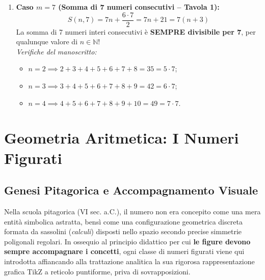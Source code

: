 \documentclass[11pt,a4paper,oneside]{report}
\begin{document}
\begin{laboratorio}
\begin{enumerate}[leftmargin=2em]
  \[
  S(n, 4) = n + (n+1) + (n+2) + (n+3) = 4n + 6 = 2(2n + 3)
  \]
  Tale somma \`e sempre pari ma \textbf{mai multipla di 4}. Per $n = 2$ si ottiene:
  \[
  S(2, 4) = 2 + 3 + 4 + 5 = 14 \quad (\text{divisibile per } 7)
  \]
  \item \textbf{Caso $m = 7$ (Somma di 7 numeri consecutivi -- Tavola 1):}
  \[
  S(n, 7) = 7n + \frac{6 \cdot 7}{2} = 7n + 21 = 7(n + 3)
  \]
  La somma di 7 numeri interi consecutivi \`e \textbf{SEMPRE divisibile per 7}, per qualunque valore di $n \in \mathbb{N}$!\\
  \textit{Verifiche del manoscritto:}
  \begin{itemize}
    \item $n = 2 \implies 2+3+4+5+6+7+8 = 35 = 5 \cdot 7$;
    \item $n = 3 \implies 3+4+5+6+7+8+9 = 42 = 6 \cdot 7$;
    \item $n = 4 \implies 4+5+6+7+8+9+10 = 49 = 7 \cdot 7$.
  \end{itemize}
\end{enumerate}
\end{laboratorio}

\chapter{Geometria Aritmetica: I Numeri Figurati}

\section{Genesi Pitagorica e Accompagnamento Visuale}
Nella scuola pitagorica (VI sec. a.C.), il numero non era concepito come una mera entit\`a simbolica astratta, bens\`i come una configurazione geometrica discreta formata da sassolini (\textit{calculi}) disposti nello spazio secondo precise simmetrie poligonali regolari.
In ossequio al principio didattico per cui \textbf{le figure devono sempre accompagnare i concetti}, ogni classe di numeri figurati viene qui introdotta affiancando alla trattazione analitica la sua rigorosa rappresentazione grafica TikZ a reticolo puntiforme, priva di sovrapposizioni.
\end{document}
